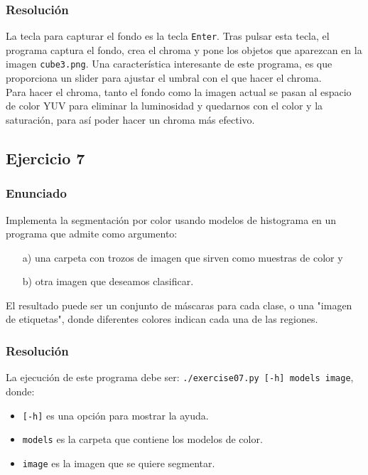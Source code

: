 \documentclass[a4paper,10pt,titlepage,oneside,openright]{book}
\begin{document}
\subsubsection*{Resolución}
La tecla para capturar el fondo es la tecla \texttt{Enter}. Tras pulsar esta tecla, el programa captura el fondo, crea el chroma y pone los objetos que aparezcan en la imagen \texttt{cube3.png}. Una característica interesante de este programa, es que proporciona un slider para ajustar el umbral con el que hacer el chroma. \\

Para hacer el chroma, tanto el fondo como la imagen actual se pasan al espacio de color YUV para eliminar la luminosidad y quedarnos con el color y la saturación, para así poder hacer un chroma más efectivo. 


\medskip
\subsection{Ejercicio 7}

\subsubsection*{Enunciado}
Implementa la segmentación por color usando modelos de histograma en un programa que admite como argumento:
\begin{enumerate}
 \item[a)] una carpeta con trozos de imagen que sirven como muestras de color y
 \item[b)] otra imagen que deseamos clasificar.
\end{enumerate}

El resultado puede ser un conjunto de máscaras para cada clase, o una "imagen de etiquetas", donde diferentes colores indican cada una de las regiones.

\subsubsection*{Resolución}
La ejecución de este programa debe ser: \texttt{./exercise07.py [-h] models image}, donde:
\begin{itemize}
 \item \texttt{[-h]} es una opción para mostrar la ayuda.
 \item \texttt{models} es la carpeta que contiene los modelos de color.
 \item \texttt{image} es la imagen que se quiere segmentar.
\end{itemize}
\end{document}
